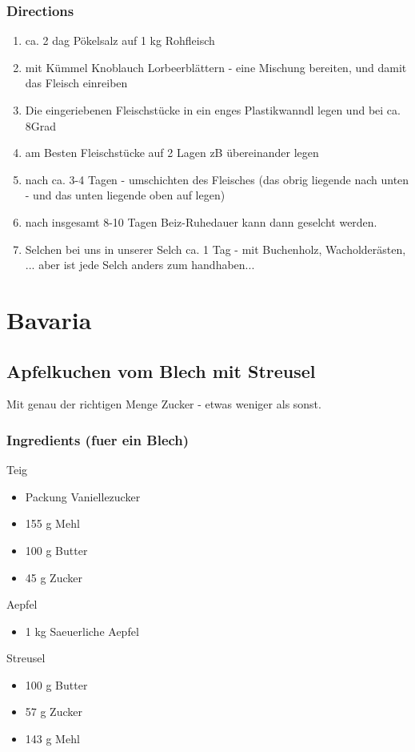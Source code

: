 \subsubsection*{Directions}
\begin{enumerate}
\item ca. 2 dag Pökelsalz auf 1 kg Rohfleisch
\item mit  Kümmel Knoblauch Lorbeerblättern - eine Mischung bereiten, und damit das Fleisch einreiben
\item Die eingeriebenen Fleischstücke in ein enges Plastikwanndl  legen und bei ca. 8Grad 
\item am Besten Fleischstücke auf 2 Lagen zB übereinander legen
\item nach ca. 3-4 Tagen - umschichten des Fleisches (das obrig liegende nach unten - und das unten liegende oben auf legen)
\item nach insgesamt 8-10 Tagen Beiz-Ruhedauer kann dann geselcht werden. 
\item Selchen bei uns in unserer Selch ca. 1 Tag - mit Buchenholz, Wacholderästen, ... aber ist jede Selch anders zum handhaben...
\end{enumerate}
\pagebreak

\section{Bavaria}

\subsection{Apfelkuchen vom Blech mit Streusel}
Mit genau der richtigen Menge Zucker - etwas weniger als sonst.
\subsubsection*{Ingredients (fuer ein Blech)}
Teig
\begin{itemize}
\item[] Packung Vaniellezucker
\item[] 155 g Mehl
\item[] 100 g Butter
\item[] 45 g Zucker
\end{itemize}
Aepfel
\begin{itemize}
\item[] 1 kg Saeuerliche Aepfel
\end{itemize}
Streusel
\begin{itemize}
\item[] 100 g Butter
\item[] 57 g Zucker
\item[] 143 g Mehl
\end{itemize}
